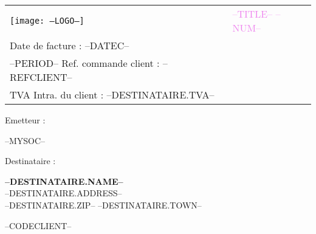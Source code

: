\newcommand{\FOOT}{--FOOT--\\
P\'enalit\'e pour paiement tardif : inter\^et l\'egal x3 et une indemnit\'e forfaitaire pour frais de recouvrement de 40 euros. R\`eglement anticip\'e, pas d'escompte.}
\renewcommand{\HEAD}{--TITLE-- --NUM--}

\newcommand{\specialcell}[2][c]{
	\parbox[#1]{5.8cm}{#2}}

\begin{tabular}{p{9cm} p{8cm}}
    \vspace{0pt} 
    \texttt{[image: --LOGO--]}
    & 
    \vspace{0pt}
   \raggedleft
	\textcolor{violet}{\textsc{\Large --TITLE-- --NUM--}}\\
	Date de facture : --DATEC--\\--PERIOD--
	Ref. commande client : --REFCLIENT--\\
	TVA Intra. du  client : --DESTINATAIRE.TVA--\\%
\end{tabular}


\begin{minipage}[t]{0.40\textwidth}
{\small Emetteur :}\\
\begin{fminipage}
--MYSOC--
\end{fminipage}
\end{minipage}
\hspace{1cm}
\begin{minipage}[t]{0.52\textwidth}
{\small Destinataire :}

\begin{fminipage}
\textbf{\large --DESTINATAIRE.NAME--}\\
--DESTINATAIRE.ADDRESS--\\
\textsc{--DESTINATAIRE.ZIP-- --DESTINATAIRE.TOWN--}\\
\begin{minipage}{\textwidth}
\flushright
{\tiny --CODECLIENT--}
\end{minipage}
\end{fminipage}
\end{minipage}

